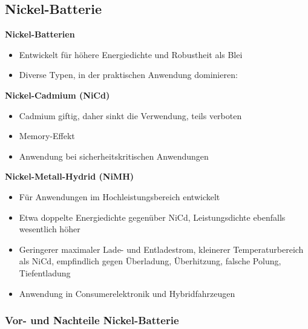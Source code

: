 \subsection{Nickel-Batterie}


  \textbf{Nickel-Batterien}
  \begin{itemize}
    \item Entwickelt für höhere Energiedichte und Robustheit als Blei
    \item Diverse Typen, in der praktischen Anwendung dominieren:
  \end{itemize}

  \textbf{Nickel-Cadmium (NiCd)}
  \begin{itemize}
    \item Cadmium giftig, daher sinkt die Verwendung, teils verboten
    \item \glqq Memory\grqq-Effekt
    \item Anwendung bei sicherheitskritischen Anwendungen
  \end{itemize}

  \textbf{Nickel-Metall-Hydrid (NiMH)}
  \begin{itemize}
    \item Für Anwendungen im Hochleistungsbereich entwickelt
    \item Etwa doppelte Energiedichte gegenüber NiCd, Leistungsdichte ebenfalls wesentlich höher
    \item Geringerer maximaler Lade- und Entladestrom, kleinerer Temperaturbereich als NiCd, empfindlich gegen Überladung, Überhitzung, falsche Polung, Tiefentladung
    \item Anwendung in Consumerelektronik und Hybridfahrzeugen
  \end{itemize}



\subsubsection{Vor- und Nachteile Nickel-Batterie}

